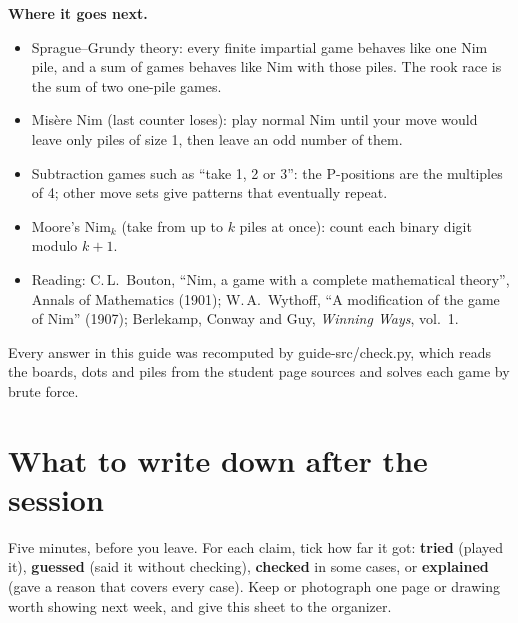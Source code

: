 \documentclass[10pt]{article}
\begin{document}
\textbf{Where it goes next.}
\begin{itemize}
\item Sprague--Grundy theory: every finite impartial game behaves like one Nim pile, and a sum of games behaves like Nim with those piles. The rook race is the sum of two one-pile games.
\item Mis\`ere Nim (last counter loses): play normal Nim until your move would leave only piles of size 1, then leave an odd number of them.
\item Subtraction games such as ``take 1, 2 or 3'': the P-positions are the multiples of 4; other move sets give patterns that eventually repeat.
\item Moore's Nim\(_k\) (take from up to \(k\) piles at once): count each binary digit modulo \(k+1\).
\item Reading: C.\,L.\ Bouton, ``Nim, a game with a complete mathematical theory'', Annals of Mathematics (1901); W.\,A.\ Wythoff, ``A modification of the game of Nim'' (1907); Berlekamp, Conway and Guy, \emph{Winning Ways}, vol.\ 1.
\end{itemize}

Every answer in this guide was recomputed by guide-src/check.py, which reads the boards, dots and piles from the student page sources and solves each game by brute force.

\newpage
\section{What to write down after the session}\label{s6}

Five minutes, before you leave. For each claim, tick how far it got: \textbf{tried} (played it), \textbf{guessed} (said it without checking), \textbf{checked} in some cases, or \textbf{explained} (gave a reason that covers every case). Keep or photograph one page or drawing worth showing next week, and give this sheet to the organizer.

\newcommand{\notesblock}[3]{%
\subsection{#1}
Problems reached (circle each one a child worked on): \quad #2\\[1pt]
{\small
\begin{tabular}{@{}p{3.45in}|p{0.5in}|p{0.42in}|p{0.55in}|p{0.6in}|p{0.6in}@{}}
\textbf{Claim} & \textbf{Child} & \textbf{Tried} & \textbf{Guessed} & \textbf{Checked} & \textbf{Explained}\\ \hline
#3
\rule{0pt}{12pt} & & & & & \\ \hline
\end{tabular}}\\[2pt]
What children tried and said, and a drawing or claim worth keeping:\\[13pt]
\rule{\textwidth}{0.4pt}\\[13pt]
\rule{\textwidth}{0.4pt}
}
\end{document}
